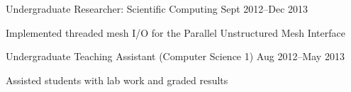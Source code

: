 \begin{cventries}
{\begin{cvitems}
    \end{cvitems}
  }
  {Undergraduate Researcher: Scientific Computing}
  {Sept 2012--Dec 2013}
  {
    \begin{cvitems}
    \item Implemented threaded mesh I/O for the Parallel Unstructured Mesh Interface
    \end{cvitems}
  }
  \cventry
  {}
  {}
  {Undergraduate Teaching Assistant (Computer Science 1)}
  {Aug 2012--May 2013}
  {
    \begin{cvitems}
    \item Assisted students with lab work and graded results
    \end{cvitems}
  }
\end{cventries}
